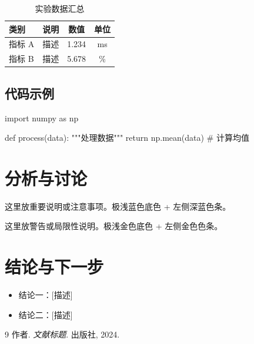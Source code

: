 \begin{table}[H]
  \centering
  \caption{实验数据汇总}
  \label{tab:data}
  \begin{tabularx}{0.9\textwidth}{lXcc}
    \toprule
    \textbf{类别} & \textbf{说明} & \textbf{数值} & \textbf{单位} \\
    \midrule
    指标 A & 描述 & 1.234 & ms \\
    指标 B & 描述 & 5.678 & \% \\
    \bottomrule
  \end{tabularx}
\end{table}

\subsection{代码示例}

\begin{codeblock}[language=Python, caption={Python 示例}]
import numpy as np

def process(data):
    """处理数据"""
    return np.mean(data)    # 计算均值
\end{codeblock}

\section{分析与讨论}

\begin{notebox}[ℹ 重要说明]
  这里放重要说明或注意事项。极浅蓝色底色 + 左侧深蓝色条。
\end{notebox}

\begin{alertbox}[⚠ 已知局限]
  这里放警告或局限性说明。极浅金色底色 + 左侧金色色条。
\end{alertbox}

\section{结论与下一步}

\begin{itemize}
  \item 结论一：[描述]
  \item 结论二：[描述]
\end{itemize}

\begin{thebibliography}{9}
   作者. \textit{文献标题}. 出版社, 2024.
\end{thebibliography}


